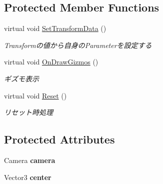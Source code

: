 \subsection*{Protected Member Functions}
\begin{DoxyCompactItemize}
\item 
virtual void \hyperlink{class_touch_area_base_a9d4d8709065668bea45eecf59c41401b}{Set\+Transform\+Data} ()
\begin{DoxyCompactList}\small\item\em Transformの値から自身の\+Parameterを設定する \end{DoxyCompactList}\item 
virtual void \hyperlink{class_touch_area_base_a775cebdb39ddba5717a89f8ff8d1c810}{On\+Draw\+Gizmos} ()
\begin{DoxyCompactList}\small\item\em ギズモ表示 \end{DoxyCompactList}\item 
virtual void \hyperlink{class_touch_area_base_a94f9466d4f70a449055e72b86d23378c}{Reset} ()
\begin{DoxyCompactList}\small\item\em リセット時処理 \end{DoxyCompactList}\end{DoxyCompactItemize}
\subsection*{Protected Attributes}
\begin{DoxyCompactItemize}
\item 
Camera {\bfseries camera}\hypertarget{class_touch_area_base_afd86e8792674bcb666bc375f5ffbb59c}{}\label{class_touch_area_base_afd86e8792674bcb666bc375f5ffbb59c}

\item 
Vector3 {\bfseries center}\hypertarget{class_touch_area_base_aab6aa27813bea53d6965fd317ab26678}{}\label{class_touch_area_base_aab6aa27813bea53d6965fd317ab26678}

\end{DoxyCompactItemize}
